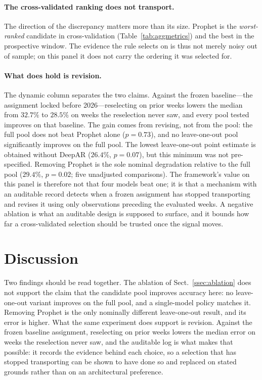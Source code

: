 \documentclass[runningheads]{llncs}
\begin{document}
\paragraph{The cross-validated ranking does not transport.}
The direction of the discrepancy matters more than its size. Prophet is
the \emph{worst-ranked} candidate in cross-validation
(Table~\ref{tab:aggmetrics}) and the best in the prospective window. The
evidence the rule selects on is thus not merely noisy out of sample; on
this panel it does not carry the ordering it was selected for.

\paragraph{What does hold is revision.}
The dynamic column separates the two claims. Against the frozen
baseline---the assignment locked before 2026---reselecting on
prior weeks lowers the median from $32.7\%$ to $28.5\%$ on weeks the
reselection never saw, and every pool tested improves on that baseline.
The gain comes from revising, not from the pool: the full pool does not
beat Prophet alone ($p{=}0.73$), and no leave-one-out pool significantly
improves on the full pool. The lowest leave-one-out point estimate is
obtained without DeepAR ($26.4\%$, $p{=}0.07$), but this minimum was not
pre-specified. Removing Prophet is the sole nominal degradation relative
to the full pool ($29.4\%$, $p{=}0.02$; five unadjusted comparisons). The framework's value on this panel is
therefore not that four models beat one; it is that a mechanism with an
auditable record detects when a frozen assignment has stopped
transporting and revises it using only observations preceding the
evaluated weeks. A negative ablation is what an auditable design is
supposed to surface, and it bounds how far a cross-validated selection
should be trusted once the signal moves.

\section{Discussion}
\label{sec:discussion}

Two findings should be read together. The ablation of
Sect.~\ref{ssec:ablation} does not support the claim that the candidate
pool improves accuracy here: no leave-one-out variant improves on the
full pool, and a single-model policy matches it. Removing Prophet is the
only nominally different leave-one-out result, and its error is higher.
What the same experiment does support is revision. Against the frozen
baseline assignment,
reselecting on prior weeks lowers the median error on weeks the
reselection never saw, and the auditable log is what makes that possible:
it records the evidence behind each choice, so a selection that has
stopped transporting can be shown to have done so and replaced on stated
grounds rather than on an architectural preference.
\end{document}
